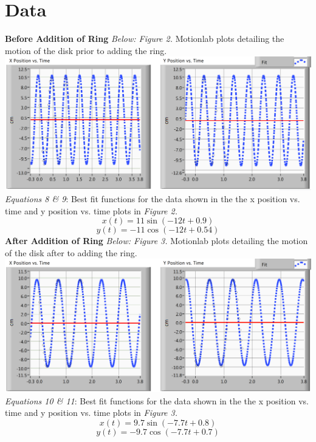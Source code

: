 \documentclass[12pt,letterpaper]{article}
\begin{document}
\section{Data}
\textbf{Before Addition of Ring}
\newline
\textit{Below: Figure 2.} Motionlab plots detailing the motion of the disk prior to adding the ring.
\newline
\includegraphics[scale=0.4]{lr4before.PNG}
\newline
\textit{Equations 8 \& 9}: Best fit functions for the data shown in the the x position vs. time and y position vs. time plots in \textit{Figure 2.}
\begin{equation}
x(t) = 11\sin(-12t+0.9)
\end{equation}
\begin{equation}
y(t) = -11\cos(-12t+0.54)
\end{equation}
\newpage
%
\hspace{-16pt}\textbf{After Addition of Ring}
\newline
\textit{Below: Figure 3.} Motionlab plots detailing the motion of the disk after to adding the ring.
\newline
\includegraphics[scale=0.4]{lr4after.PNG}
\newline
\textit{Equations 10 \& 11}: Best fit functions for the data shown in the the x position vs. time and y position vs. time plots in \textit{Figure 3.}
\begin{equation}
x(t) = 9.7\sin(-7.7t+0.8)
\end{equation}
\begin{equation}
y(t) = -9.7\cos(-7.7t+0.7)
\end{equation}
\end{document}
